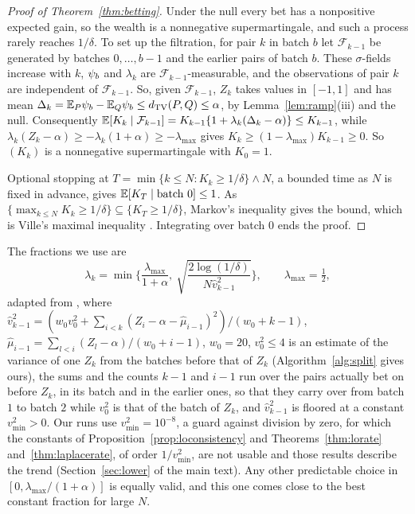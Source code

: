 \begin{proof}[Proof of Theorem~\ref{thm:betting}]
Under the null every bet has a nonpositive expected gain, so the wealth is a nonnegative supermartingale, and such a
process rarely reaches $1/\delta$. To set up the filtration, for pair $k$ in batch $b$ let $\mathcal F_{k-1}$ be generated
by batches $0,\dots,b-1$ and the earlier pairs of batch $b$. These $\sigma$-fields increase with $k$, $\psi_b$ and
$\lambda_k$ are $\mathcal F_{k-1}$-measurable, and the observations of pair $k$ are independent of $\mathcal F_{k-1}$.
So, given $\mathcal F_{k-1}$, $Z_k$ takes values in $[-1,1]$ and has mean
$\Delta_k=\mathbb{E}_P\psi_b-\mathbb{E}_Q\psi_b\le d_{\mathrm{TV}}(P,Q)\le\alpha$, by Lemma~\ref{lem:ramp}(iii) and the null. Consequently
$\mathbb{E}[K_k\mid\mathcal F_{k-1}]=K_{k-1}\{1+\lambda_k(\Delta_k-\alpha)\}\le K_{k-1}$, while
$\lambda_k(Z_k-\alpha)\ge-\lambda_k(1+\alpha)\ge-\lambda_{\max}$ gives $K_k\ge(1-\lambda_{\max})K_{k-1}\ge0$. So $(K_k)$ is
a nonnegative supermartingale with $K_0=1$.

Optional stopping at $T=\min\{k\le N:K_k\ge1/\delta\}\wedge N$, a bounded time as $N$ is fixed in advance, gives
$\mathbb{E}[K_T\mid\text{batch }0]\le1$. As $\{\max_{k\le N}K_k\ge1/\delta\}\subseteq\{K_T\ge1/\delta\}$, Markov's inequality
gives the bound, which is Ville's maximal inequality \citep{ville1939}. Integrating over batch $0$ ends the proof.
\end{proof}

The fractions we use are
\begin{equation}
\lambda_k=\min\Big\{\frac{\lambda_{\max}}{1+\alpha},\ \sqrt{\frac{2\log(1/\delta)}{N\widehat v^2_{k-1}}}\Big\},
\qquad \lambda_{\max}=\tfrac12,
\label{eq:fractions}
\end{equation}
adapted from \citet[Remark~1]{waudbysmith2024estimating}, where
$\widehat v^2_{k-1}=(w_0v_0^2+\sum_{i<k}(Z_i-\alpha-\widehat\mu_{i-1})^2)/(w_0+k-1)$,
$\widehat\mu_{i-1}=\sum_{l<i}(Z_l-\alpha)/(w_0+i-1)$, $w_0=20$, $v_0^2\le4$ is an estimate of the variance of one
$Z_k$ from the batches before that of $Z_k$ (Algorithm~\ref{alg:split} gives ours), the sums and the counts $k-1$ and
$i-1$ run over the pairs actually bet on before $Z_k$, in its batch and in the earlier ones, so that they carry over
from batch $1$ to batch $2$ while $v_0^2$ is that of the batch of $Z_k$, and $\widehat v^2_{k-1}$ is floored at a constant $v^2_{\min}>0$. Our runs use
$v^2_{\min}=10^{-8}$, a guard against division by zero, for which the constants of Proposition~\ref{prop:loconsistency}
and Theorems~\ref{thm:lorate} and~\ref{thm:laplacerate}, of order $1/v^2_{\min}$, are not usable and those results
describe the trend (Section~\ref{sec:lower} of the main text). Any other predictable choice in
$[0,\lambda_{\max}/(1+\alpha)]$ is equally valid, and this one comes close to the best constant fraction for large $N$.

